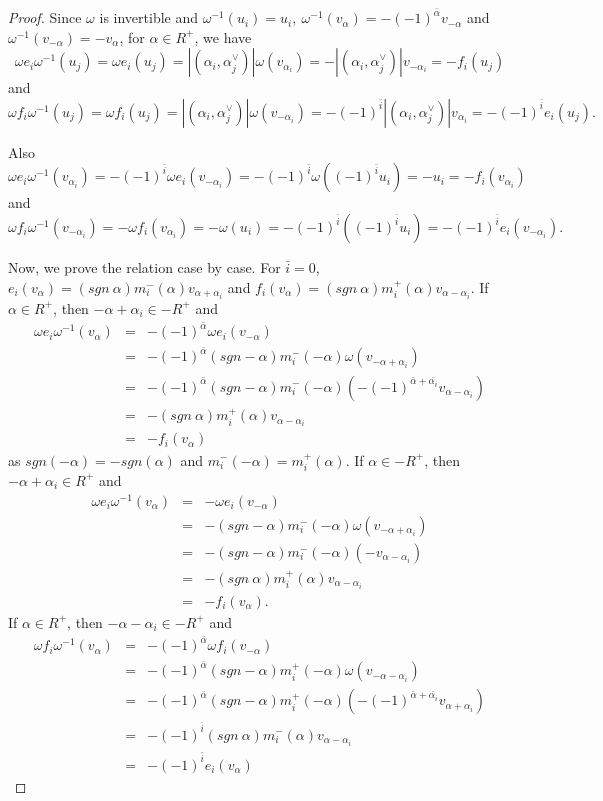 \documentclass[11pt]{amsart}
\theoremstyle{plain}
\theoremstyle{definition}
\numberwithin{equation}{section}
\newcommand{\al}{\alpha}
\newcommand{\om}{\omega}
\begin{document}
	\begin{proof}
		Since $\om$ is invertible and $\om^{-1}(u_i)=u_i,~\om^{-1}(v_{\al})=-(-1)^{\bar{\al}}v_{-\al}$ and $\om^{-1}(v_{-\al})=-v_{\al}$, for $\al\in R^+$, we have
		$$\om e_i\om^{-1}(u_j)=\om e_i(u_j)=|(\al_i,\al_j^{\vee})|\om(v_{\al_i})=-|(\al_i,\al_j^{\vee})|v_{-\al_i}=-f_i(u_j)$$ and $$\om f_i\om^{-1}(u_j)=\om f_i(u_j)=|(\al_i,\al_j^{\vee})|\om(v_{-\al_i})=-(-1)^{\bar{i}}|(\al_i,\al_j^{\vee})|v_{\al_i}=-(-1)^{\bar{i}}e_i(u_j).$$ 
		
		Also $$\om e_i\om^{-1}(v_{\al_i})=-(-1)^{\bar{i}}\om e_i(v_{-\al_i})=-(-1)^{\bar{i}}\om((-1)^{\bar{i}}u_i)=-u_i=-f_i(v_{\al_i})$$ and $$\om f_i\om^{-1}(v_{-\al_i})=-\om f_i(v_{\al_i})=-\om(u_i)=-(-1)^{\bar{i}}((-1)^{\bar{i}}u_i)=-(-1)^{\bar{i}}e_i(v_{-\al_i}).$$
		
		Now, we prove the relation case by case. For $\bar{i}=0$, $e_i(v_{\al})=(sgn~\al)m_i^-(\al)v_{\al+\al_i}$ and $f_i(v_{\al})=(sgn~\al)m_i^+(\al)v_{\al-\al_i}$. If $\al\in R^+$, then $-\al+\al_i\in-R^+$ and
		\begin{eqnarray*}
			\om e_i\om^{-1}(v_{\al})&=&-(-1)^{\bar{\al}}\om e_i(v_{-\al})\\&=&-(-1)^{\bar{\al}}(sgn-\al)m_i^-(-\al)\om(v_{-\al+\al_i})\\&=&-(-1)^{\bar{\al}}(sgn-\al)m_i^-(-\al)(-(-1)^{\bar{\al}+\bar{\al_i}}v_{\al-\al_i})\\&=&-(sgn~\al)m_i^+(\al)v_{\al-\al_i}\\&=&-f_i(v_{\al})
		\end{eqnarray*}
		as $sgn(-\al)=-sgn(\al)$ and $m_i^-(-\al)=m_i^+(\al)$. If $\al\in-R^+$, then $-\al+\al_i\in R^+$ and 
		\begin{eqnarray*}
			\om e_i\om^{-1}(v_{\al})&=&-\om e_i(v_{-\al})\\&=&-(sgn-\al)m_i^-(-\al)\om(v_{-\al+\al_i})\\&=&-(sgn-\al)m_i^-(-\al)(-v_{\al-\al_i})\\&=&-(sgn~\al)m_i^+(\al)v_{\al-\al_i}\\&=&-f_i(v_{\al}).
		\end{eqnarray*}
		If $\al\in R^+$, then $-\al-\al_i\in-R^+$ and
		\begin{eqnarray*}
			\om f_i\om^{-1}(v_{\al})&=&-(-1)^{\bar{\al}}\om f_i(v_{-\al})\\&=&-(-1)^{\bar{\al}}(sgn-\al)m_i^+(-\al)\om(v_{-\al-\al_i})\\&=&-(-1)^{\bar{\al}}(sgn-\al)m_i^+(-\al)(-(-1)^{\bar{\al}+\bar{\al_i}}v_{\al+\al_i})\\&=&-(-1)^{\bar{i}}(sgn~\al)m_i^-(\al)v_{\al-\al_i}\\&=&-(-1)^{\bar{i}}e_i(v_{\al})

\end{eqnarray*}
\end{proof}
\end{document}

